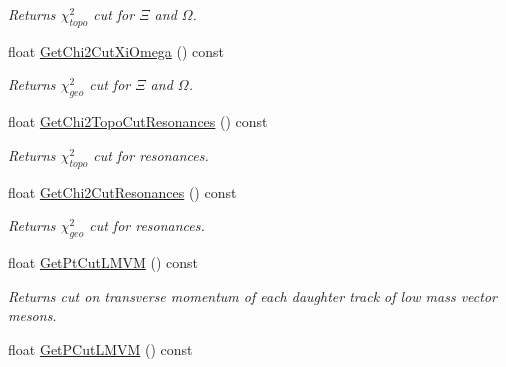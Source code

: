 \begin{DoxyCompactItemize}
\begin{DoxyCompactList}\small\item\em Returns $\chi^2_{topo}$ cut for $\Xi$ and $\Omega$. \end{DoxyCompactList}\item 
float \hyperlink{classKFParticleFinder_a8a45c6e073cfc540cc88838e9327e8ce}{Get\+Chi2\+Cut\+Xi\+Omega} () const \hypertarget{classKFParticleFinder_a8a45c6e073cfc540cc88838e9327e8ce}{}\label{classKFParticleFinder_a8a45c6e073cfc540cc88838e9327e8ce}

\begin{DoxyCompactList}\small\item\em Returns $\chi^2_{geo}$ cut for $\Xi$ and $\Omega$. \end{DoxyCompactList}\item 
float \hyperlink{classKFParticleFinder_a4b412f9b016eee588083abbc0e237aa8}{Get\+Chi2\+Topo\+Cut\+Resonances} () const \hypertarget{classKFParticleFinder_a4b412f9b016eee588083abbc0e237aa8}{}\label{classKFParticleFinder_a4b412f9b016eee588083abbc0e237aa8}

\begin{DoxyCompactList}\small\item\em Returns $\chi^2_{topo}$ cut for resonances. \end{DoxyCompactList}\item 
float \hyperlink{classKFParticleFinder_adfdd904be39794180b5c2b6b9b77b59a}{Get\+Chi2\+Cut\+Resonances} () const \hypertarget{classKFParticleFinder_adfdd904be39794180b5c2b6b9b77b59a}{}\label{classKFParticleFinder_adfdd904be39794180b5c2b6b9b77b59a}

\begin{DoxyCompactList}\small\item\em Returns $\chi^2_{geo}$ cut for resonances. \end{DoxyCompactList}\item 
float \hyperlink{classKFParticleFinder_a4d2c8ff910323e596c61b66e2260220d}{Get\+Pt\+Cut\+L\+M\+VM} () const \hypertarget{classKFParticleFinder_a4d2c8ff910323e596c61b66e2260220d}{}\label{classKFParticleFinder_a4d2c8ff910323e596c61b66e2260220d}

\begin{DoxyCompactList}\small\item\em Returns cut on transverse momentum of each daughter track of low mass vector mesons. \end{DoxyCompactList}\item 
float \hyperlink{classKFParticleFinder_a512248319f207c1ae825403cbc15202c}{Get\+P\+Cut\+L\+M\+VM} () const \hypertarget{classKFParticleFinder_a512248319f207c1ae825403cbc15202c}{}\label{classKFParticleFinder_a512248319f207c1ae825403cbc15202c}


\end{DoxyCompactItemize}
